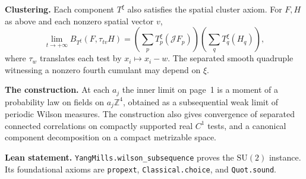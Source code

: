 \documentclass[11pt,letterpaper]{article}
\newcommand{\SU}{\mathrm{SU}}
\newcommand{\J}{\mathcal J}
\begin{document}
\textbf{Clustering.} Each component $T^\xi$ also satisfies the spatial cluster
axiom. For $F,H$ as above and each nonzero spatial vector $v$,
\[
 \lim_{t\to+\infty} B_{T^\xi}(F,\tau_{tv} H)
   =\left(\sum_p T^\xi_p(\J F_p)\right)\left(\sum_q T^\xi_q(H_q)\right),
\]
where $\tau_w$ translates each test by $x_i\mapsto x_i-w$.
The separated smooth quadruple witnessing a nonzero fourth cumulant may
depend on $\xi$.

\textbf{The construction.} At each $a_j$ the inner limit on page~1 is a moment
of a probability law on fields on $a_j\mathbb Z^4$, obtained as a subsequential
weak limit of periodic Wilson measures. The construction also gives convergence
of separated connected correlations on compactly supported real $C^1$ tests,
and a canonical component decomposition on a compact metrizable space.

\textbf{Lean statement.} \texttt{YangMills.wilson\_subsequence} proves the
$\SU(2)$ instance. Its foundational axioms are \texttt{propext},
\texttt{Classical.choice}, and \texttt{Quot.sound}.
\end{document}
